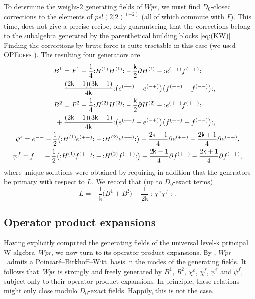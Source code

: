 \documentclass[10pt,a4paper]{amsart}
\numberwithin{equation}{section}
\newcommand{\pd}{\partial} %
\newcommand{\kk}{\mathsf{k}} %
\DeclarePairedDelimiter{\brac}{\lparen}{\rparen} %
\newcommand{\no}[1]{\mathopen{:} #1 \mathclose{:}} %
\newcommand{\alg}[1]{\mathfrak{#1}} %
\newcommand{\VOA}[1]{\mathsf{#1}} %
\newcommand{\SLSA}[3]{\alg{#1}_{#2 \vert #3}} %
\newcommand{\psl}{\SLSA{psl}{2}{2}}
\newcommand{\uwalg}[2]{\VOA{W}^{#1}_{\mathrm{#2}}} %
\newcommand{\upr}[1][\kk]{\uwalg{#1}{pr}} %
\newcommand{\pbw}{Poincar\'{e}--Birkhoff--Witt}
\newcommand{\ope}{operator product expansion}
\newcommand{\opes}{\ope s}
\def\smash#1{#1}
\def\psl{psl(2|2)}
\def\upr{Wpr}
\begin{document}
To determine the weight-$2$ generating fields of \smash{$\upr$}, we must find $D_0$-closed corrections to the elements of \smash{$\psl^{(-2)}$} (all of which commute with $F$).
This time, \cite{KacQua03b} does not give a precise recipe, only guaranteeing that the corrections belong to the subalgebra generated by the parenthetical building blocks \eqref{eq:(KW)}.
Finding the corrections by brute force is quite tractable in this case (we used \textsc{OPEdefs} \cite{ThiOPE91}).
The resulting four generators are
\begin{gather*}
		B^1 = F^1 - \frac{1}{4} \no{H^{(1)}H^{(1)}} - \frac{\kk}{2} \pd H^{(1)} - \no{e^{(-+)}f^{(-+)}}
		\\
\phantom{B^1 =}{}	- \frac{(2\kk-1)(3\kk+1)}{4\kk} \no{\big(e^{(+-)}-e^{(-+)}\big) \big(f^{(+-)}-f^{(-+)}\big)}, \\
		B^2 = F^2 + \frac{1}{4} \no{H^{(2)}H^{(2)}} - \frac{\kk}{2} \pd H^{(2)} - \no{e^{(+-)}f^{(+-)}}
			\\
\phantom{B^2 =}{}+ \frac{(2\kk+1)(3\kk-1)}{4\kk} \no{\big(e^{(+-)}-e^{(-+)}\big) \big(f^{(+-)}-f^{(-+)}\big)}, \\
		\psi^e = e^{--} - \frac{1}{2} \brac[\big]{\no{H^{(1)}e^{(+-)}} - \no{H^{(2)}e^{(-+)}}} - \frac{2\kk-1}{4} \pd e^{(+-)} - \frac{2\kk+1}{4} \pd e^{(-+)}, \\
		\psi^f = f^{--} - \frac{1}{2} \brac[\big]{\no{H^{(1)}f^{(+-)}} - \no{H^{(2)}f^{(-+)}}} - \frac{2\kk-1}{4} \pd f^{(+-)} - \frac{2\kk+1}{4} \pd f^{(-+)},
\end{gather*}
where unique solutions were obtained by requiring in addition that the generators be primary with respect to $L$.
We record that (up to $D_0$-exact terms)
\[
	L = -\frac{1}{\kk} \big(B^1+B^2\big) - \frac{1}{2\kk} \no{\chi^e\chi^f}.
\]

\subsection{Operator product expansions} \label{sec:opes}

Having explicitly computed the generating fields of the universal level-$\kk$ principal W-algebra~$\upr$, we now turn to its \opes.
By \cite[Theorem~4.1 and Remark~4.2]{KacQua03b}, \smash{$\upr$}~admits a \pbw\ basis in the modes of the generating fields.
It follows that~\smash{$\upr$} is strongly and freely generated by $B^1$, $B^2$, $\chi^e$, $\chi^f$, $\psi^e$ and $\psi^f$, subject only to their \opes.
In principle, these relations might only close modulo $D_0$-exact fields.
Happily, this is not the case.
\end{document}
